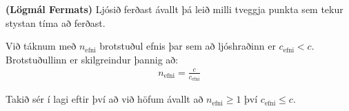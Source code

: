 \ifdefined \wholebook \else\documentclass[oneside]{book}\usepackage{EdlBook}\graphicspath{{figures/}}
\begin{document}
\begin{tcolorbox}
\begin{theorem}
\textbf{(Lögmál Fermats)} Ljósið ferðast ávallt þá leið milli tveggja punkta sem tekur stystan tíma að ferðast.
\end{theorem}
\end{tcolorbox}


\begin{tcolorbox}
\begin{definition}
Við táknum með $n_{\text{efni}}$ brotstuðul efnis þar sem að ljóshraðinn er $c_{\text{efni}} < c$. Brotstuðullinn er skilgreindur þannig að:
\begin{align*}
    n_{\text{efni}} = \frac{c}{c_{\text{efni}}}
\end{align*}
\end{definition}
\end{tcolorbox}

Takið sér í lagi eftir því að við höfum ávallt að $n_{\text{efni}} \geq 1$ því $c_{\text{efni}} \leq c$.

\end{document}
